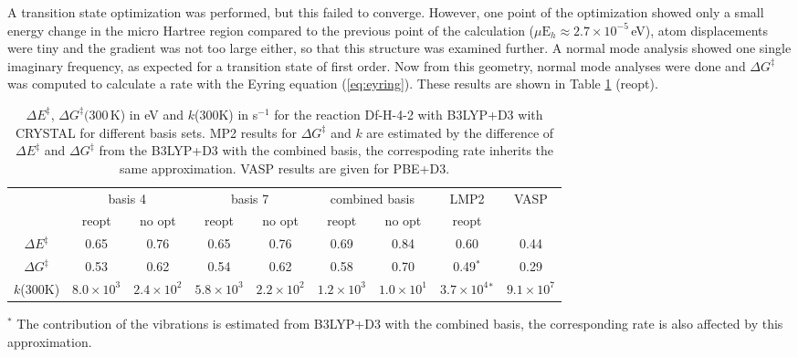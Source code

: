 \documentclass[11pt,DIV=13,BCOR=5mm,a4paper,headinclude]{scrbook}
\begin{document}
A transition state optimization was performed, but this failed to converge.
However, one point of the optimization showed only a small energy change in the micro Hartree region compared to the previous point of the calculation ($\mu\textrm{E}_h \approx 2.7\times 10^{-5}\,$eV), atom displacements were tiny and the gradient was not too large either, so that this structure was examined further.
A normal mode analysis showed one single imaginary frequency, as expected for a transition state of first order.
Now from this geometry, normal mode analyses were done and $\Delta G^\ddagger$ was computed to calculate a rate with the Eyring equation (\ref{eq:eyring}).
These results are shown in Table \ref{tab:k_crystal-reopt+noopt} (reopt).
\begin{table}[!h]
  \centering
  \caption{$\Delta E^\ddagger$, $\Delta G^\ddagger(300\,$K) in eV and $k$(300K) in s$^{-1}$ for the reaction Df-H-4-2 with B3LYP+D3 with CRYSTAL for different basis sets.
  MP2 results for $\Delta G^\ddagger$ and $k$ are estimated by the difference of $\Delta E^\ddagger$ and $\Delta G^\ddagger$ from the B3LYP+D3 with the combined basis, the correspoding rate inherits the same approximation.
  VASP results are given for PBE+D3.}
  \begin{tabular}{c|cc|cc|cc|c|c}%
  \toprule
   & \multicolumn{2}{c}{basis 4} &\multicolumn{2}{c}{basis 7} &\multicolumn{2}{c}{combined basis}&LMP2 &VASP\\ 
   & reopt & no opt & reopt & no opt &reopt & no opt & reopt& \\\midrule
   $\Delta E^\ddagger$ &0.65 & 0.76 &0.65 &0.76 &0.69 & 0.84 & 0.60&0.44\\
   $\Delta G^\ddagger$ &0.53 &0.62 &0.54 &0.62 &0.58 & 0.70 &0.49$^\ast$ &0.29\\
   $k$(300K) &$8.0\times 10^3$ &$2.4\times 10^2$ &$5.8\times 10^3$ &$2.2\times 10^2$ &$1.2\times 10^3$ &$1.0\times 10^1$ & $3.7\times 10^4$$^\ast$& $9.1\times 10^7$\\\bottomrule
  \end{tabular}
  \begin{tablenotes}
 \footnotesize
\item[] $^\ast$ The contribution of the vibrations is estimated from B3LYP+D3 with the combined basis, the corresponding rate is also affected by this approximation.
\end{tablenotes}
  \label{tab:k_crystal-reopt+noopt}
\end{table}
\\
\end{document}
